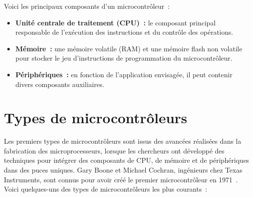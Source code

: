 \documentclass[a4paper,12pt,twoside]{report}
\theoremstyle{definition}
\theoremstyle{plain}
\theoremstyle{remark}
\begin{document}
Voici les principaux composants d'un microcontrôleur~:
\begin{itemize}
	\item \textbf{Unité centrale de traitement (\ac{CPU})~:} le composant principal
	      responsable de l'exécution des instructions et du contrôle des opérations.
	\item \textbf{Mémoire~:} une mémoire volatile (\ac{RAM}) et une mémoire flash non
	      volatile pour stocker le jeu d'instructions de programmation du microcontrôleur.
	\item \textbf{Périphériques~:} en fonction de l'application envisagée, il peut
	      contenir divers composants auxiliaires.
\end{itemize}

\section{Types de microcontrôleurs}

Les premiers types de microcontrôleurs sont issus des avancées réalisées dans la fabrication
des microprocesseurs, lorsque les chercheurs ont développé des techniques pour intégrer des
composants de \ac{CPU}, de mémoire et de périphériques dans des puces uniques. Gary Boone et
Michael Cochran, ingénieurs chez Texas Instruments, sont connus pour avoir créé le premier
microcontrôleur en 1971~\cite{ibm_microcontrollers}. Voici quelques-uns des types de
microcontrôleurs les plus courants~:
\end{document}
